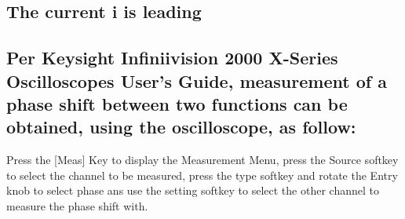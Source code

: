 \documentclass{article}
\begin{document}
\subsection{The current i is leading}
\subsection{Per Keysight Infiniivision 2000 X-Series Oscilloscopes User's Guide, measurement of a phase shift between two functions can be obtained, using the oscilloscope, as follow:}

Press the [Meas] Key to display the Measurement Menu, press the Source softkey to select the channel to be measured, press the type softkey and rotate the Entry knob to select phase ans use the setting softkey to select the other channel to measure the phase shift with.
\end{document}
